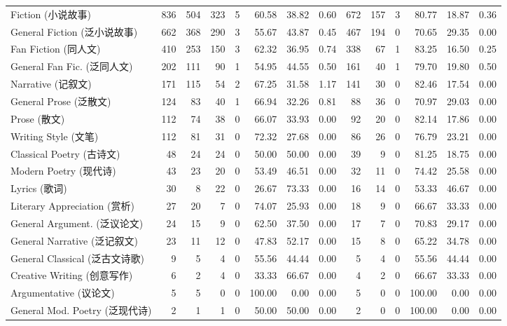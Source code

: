 \begin{table}[t]
\begin{tabular}{l r | rrr rrr | rrr rrr}
Fiction (小说故事)                & 836 & 504 & 323 &  5 & 60.58 & 38.82 & 0.60  & 672 & 157 &  3 & 80.77 & 18.87 & 0.36 \\
General Fiction (泛小说故事)      & 662 & 368 & 290 &  3 & 55.67 & 43.87 & 0.45  & 467 & 194 &  0 & 70.65 & 29.35 & 0.00 \\
Fan Fiction (同人文)              & 410 & 253 & 150 &  3 & 62.32 & 36.95 & 0.74  & 338 &  67 &  1 & 83.25 & 16.50 & 0.25 \\
General Fan Fic. (泛同人文)      & 202 & 111 &  90 &  1 & 54.95 & 44.55 & 0.50  & 161 &  40 &  1 & 79.70 & 19.80 & 0.50 \\
Narrative (记叙文)                & 171 & 115 &  54 &  2 & 67.25 & 31.58 & 1.17  & 141 &  30 &  0 & 82.46 & 17.54 & 0.00 \\
General Prose (泛散文)            & 124 &  83 &  40 &  1 & 66.94 & 32.26 & 0.81  &  88 &  36 &  0 & 70.97 & 29.03 & 0.00 \\
Prose (散文)                      & 112 &  74 &  38 &  0 & 66.07 & 33.93 & 0.00  &  92 &  20 &  0 & 82.14 & 17.86 & 0.00 \\
Writing Style (文笔)              & 112 &  81 &  31 &  0 & 72.32 & 27.68 & 0.00  &  86 &  26 &  0 & 76.79 & 23.21 & 0.00 \\
Classical Poetry (古诗文)         &  48 &  24 &  24 &  0 & 50.00 & 50.00 & 0.00  &  39 &   9 &  0 & 81.25 & 18.75 & 0.00 \\
Modern Poetry (现代诗)            &  43 &  23 &  20 &  0 & 53.49 & 46.51 & 0.00  &  32 &  11 &  0 & 74.42 & 25.58 & 0.00 \\
Lyrics (歌词)                     &  30 &   8 &  22 &  0 & 26.67 & 73.33 & 0.00  &  16 &  14 &  0 & 53.33 & 46.67 & 0.00 \\
Literary Appreciation (赏析)               &  27 &  20 &   7 &  0 & 74.07 & 25.93 & 0.00  &  18 &   9 &  0 & 66.67 & 33.33 & 0.00 \\
General Argument. (泛议论文)     &  24 &  15 &   9 &  0 & 62.50 & 37.50 & 0.00  &  17 &   7 &  0 & 70.83 & 29.17 & 0.00 \\
General Narrative (泛记叙文)      &  23 &  11 &  12 &  0 & 47.83 & 52.17 & 0.00  &  15 &   8 &  0 & 65.22 & 34.78 & 0.00 \\
General Classical (泛古文诗歌)    &   9 &   5 &   4 &  0 & 55.56 & 44.44 & 0.00  &   5 &   4 &  0 & 55.56 & 44.44 & 0.00 \\
Creative Writing (创意写作)       &   6 &   2 &   4 &  0 & 33.33 & 66.67 & 0.00  &   4 &   2 &  0 & 66.67 & 33.33 & 0.00 \\
Argumentative (议论文)            &   5 &   5 &   0 &  0 & 100.00 & 0.00 & 0.00  &   5 &   0 &  0 & 100.00 & 0.00 & 0.00 \\
General Mod. Poetry (泛现代诗)   &   2 &   1 &   1 &  0 & 50.00 & 50.00 & 0.00  &   2 &   0 &  0 & 100.00 & 0.00 & 0.00 \\


\end{tabular}
\end{table}
